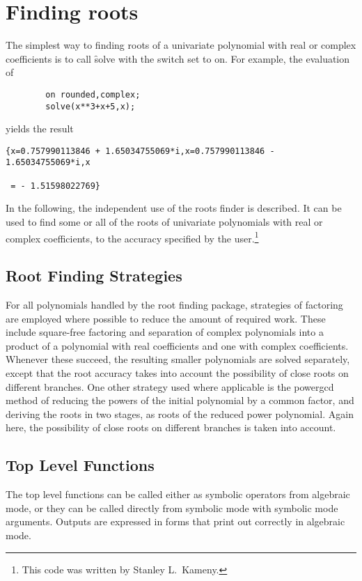 \section{Finding roots}
\hypertarget{package:ROOTS}{}

The simplest way to finding roots of a univariate polynomial with real
or complex coefficients is to call \f{solve} with the switch
 set to on. For example, the evaluation of
\begin{verbatim}
        on rounded,complex;
        solve(x**3+x+5,x);
\end{verbatim}
yields the result
\begin{verbatim}
{x=0.757990113846 + 1.65034755069*i,x=0.757990113846 - 1.65034755069*i,x

 = - 1.51598022769}
\end{verbatim}

In the following, the independent use of the roots finder is
described. It can be used to find some or all of the roots of
univariate polynomials with real or complex coefficients, to the
accuracy specified by the user.\footnote{This code was written by Stanley L.~Kameny.}

\subsection{Root Finding Strategies}

For all polynomials handled by the root finding package, strategies of
factoring are employed where possible to reduce the amount of required
work.  These include square-free factoring and separation of complex
polynomials into a product of a polynomial with real coefficients and one
with complex coefficients.  Whenever these succeed, the resulting smaller
polynomials are solved separately, except that the root accuracy takes
into account the possibility of close roots on different branches.  One
other strategy used where applicable is the powergcd method of reducing
the powers of the initial polynomial by a common factor, and deriving the
roots in two stages, as roots of the reduced power polynomial.  Again
here, the possibility of close roots on different branches is taken into
account.

\subsection{Top Level Functions}

The top level functions can be called either as symbolic operators from
algebraic mode, or they can be called directly from symbolic mode with
symbolic mode arguments.  Outputs are expressed in forms that print out
correctly in algebraic mode.


